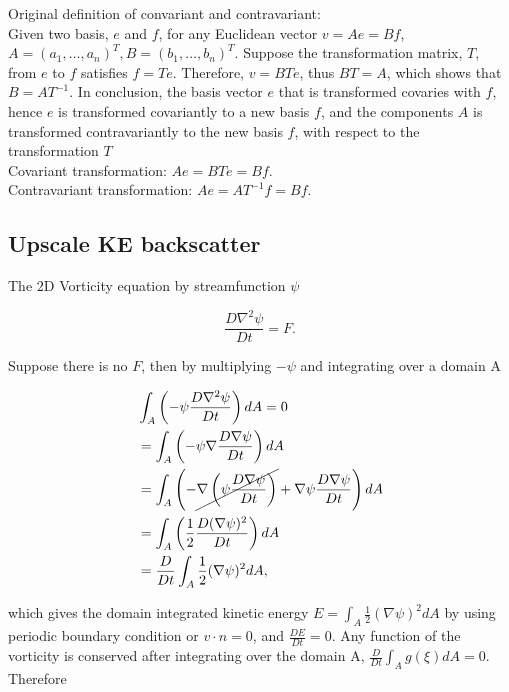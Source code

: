 Original definition of convariant and contravariant: \\ Given two basis, $e$ and $f$, for any
Euclidean vector $v= A e= B f$, $A=(a_1,\dotsc,a_n)^T, B=(b_1,\dotsc,b_n)^T$. Suppose the
transformation matrix, $T$, from $e$ to $f$ satisfies $f= Te$.  Therefore, $v= B T e$, thus $B T=
A$, which shows that $B= A T^{-1}$. In conclusion, the basis vector $e$ that is transformed covaries
with $f$, hence $e$ is transformed covariantly to a new basis $f$, and the components $A$ is
transformed contravariantly to the new basis $f$, with respect to the transformation $T$  \\
Covariant transformation: $A e=  BTe= Bf$. \\ Contravariant transformation: $A e= AT^{-1} f= Bf$. \\
\subsection{Upscale KE backscatter}

The $2$D Vorticity equation by streamfunction $\psi$

\begin{equation} \frac{D \nabla^2\psi}{D t} = F.  \end{equation}

Suppose there is no $F$, then by multiplying $-\psi$ and integrating over a domain A

\begin{equation} \begin{aligned} & \int_A \left( -\psi \frac{D\nabla^2\psi}{Dt} \right) dA= 0 \\ & =
\int_A \left( -\psi \nabla\frac{D\nabla\psi}{Dt} \right) dA \\ & = \int_A \left( -\cancel{\nabla
\left( \psi \frac{D \nabla\psi}{Dt} \right)} + \nabla \psi \frac{D\nabla\psi}{Dt} \right) dA \\ & =
\int_A \left( \frac{1}{2} \frac{D(\nabla\psi)^2}{Dt} \right) dA \\ & = \frac{D}{Dt} \int_A
\frac{1}{2} (\nabla\psi)^2 dA, \end{aligned} \end{equation}

which gives the domain integrated kinetic energy $E = \int_A\frac{1}{2} (\nabla\psi)^2 dA$ by using
periodic boundary condition or $v \cdot n= 0$, and $\frac{D E}{Dt}=0$.  Any function of the
vorticity is conserved after integrating over the domain A, $\frac{D}{Dt} \int_A g(\xi) dA= 0$.
Therefore 

